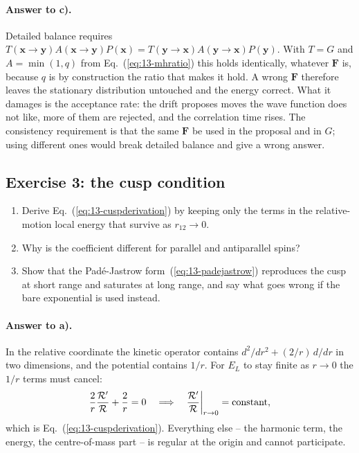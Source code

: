\paragraph{Answer to c).}
Detailed balance requires
$T(\bm{x}\to\bm{y})A(\bm{x}\to\bm{y})P(\bm{x})
= T(\bm{y}\to\bm{x})A(\bm{y}\to\bm{x})P(\bm{y})$.  With $T=G$ and
$A=\min(1,q)$ from Eq.~(\ref{eq:13-mhratio}) this holds identically,
whatever $\bm{F}$ is, because $q$ is by construction the ratio that makes it
hold.  A wrong $\bm{F}$ therefore leaves the stationary distribution
untouched and the energy correct.  What it damages is the acceptance rate:
the drift proposes moves the wave function does not like, more of them are
rejected, and the correlation time rises.  The consistency requirement is that
the same $\bm{F}$ be used in the proposal and in $G$; using different ones
would break detailed balance and give a wrong answer.

\subsection*{Exercise 3: the cusp condition}
\label{ex:13-cusp}

\begin{enumerate}
  \item[a)] Derive Eq.~(\ref{eq:13-cuspderivation}) by keeping only the terms
  in the relative-motion local energy that survive as $r_{12}\to0$.
  \item[b)] Why is the coefficient different for parallel and antiparallel
  spins?
  \item[c)] Show that the Pad\'e-Jastrow form~(\ref{eq:13-padejastrow})
  reproduces the cusp at short range and saturates at long range, and say what
  goes wrong if the bare exponential is used instead.
\end{enumerate}

\paragraph{Answer to a).}
In the relative coordinate the kinetic operator contains
$d^2/dr^2 + (2/r)\,d/dr$ in two dimensions, and the potential contains
$1/r$.  For $E_L$ to stay finite as $r\to0$ the $1/r$ terms must cancel:
\[
  \frac{2}{r}\frac{{\cal R}'}{\cal R} + \frac{2}{r} = 0
  \quad\Longrightarrow\quad
  \frac{{\cal R}'}{\cal R}\bigg|_{r\to0} = \text{constant},
\]
which is Eq.~(\ref{eq:13-cuspderivation}).  Everything else -- the harmonic
term, the energy, the centre-of-mass part -- is regular at the origin and
cannot participate.

